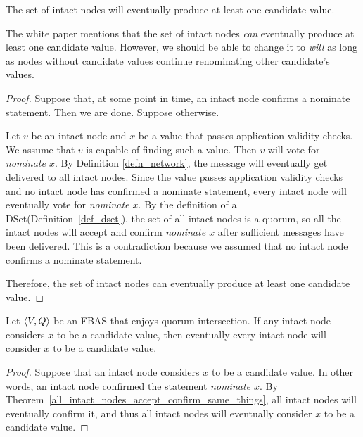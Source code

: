 \begin{thm}\label{eventually_one_candidate}
    The set of intact nodes will eventually produce at least one candidate value.
\end{thm}

The white paper mentions that the set of intact nodes \textit{can} eventually produce at least one candidate value.
However, we should be able to change it to \textit{will} as long as nodes without candidate values continue renominating other candidate's values.

\begin{proof}
    Suppose that, at some point in time, an intact node confirms a nominate statement.
    Then we are done.
    Suppose otherwise.

    Let $v$ be an intact node and $x$ be a value that passes application validity checks.
    We assume that $v$ is capable of finding such a value.
    Then $v$ will vote for \textit{nominate $x$}.
    By Definition \ref{defn_network}, the message will eventually get delivered to all intact nodes.
    Since the value passes application validity checks and no intact node has confirmed a nominate statement, every intact node will eventually vote for \textit{nominate $x$}.
    By the definition of a DSet(Definition~\ref{def_dset}), the set of all intact nodes is a quorum, so all the intact nodes will accept and confirm \textit{nominate $x$} after sufficient messages have been delivered.
    This is a contradiction because we assumed that no intact node confirms a nominate statement.

    Therefore, the set of intact nodes can eventually produce at least one candidate value.
\end{proof}

\begin{thm}\label{eventually_all_intact_nodes_consider_candidate}
    Let $\ev{V, Q}$ be an FBAS that enjoys quorum intersection.
    If any intact node considers $x$ to be a candidate value, then eventually every intact node will consider $x$ to be a candidate value.
\end{thm}

\begin{proof}
    Suppose that an intact node considers $x$ to be a candidate value.
    In other words, an intact node confirmed the statement \textit{nominate $x$}.
    By Theorem~\ref{all_intact_nodes_accept_confirm_same_things}, all intact nodes will eventually confirm it, and thus all intact nodes will eventually consider $x$ to be a candidate value.
\end{proof}


